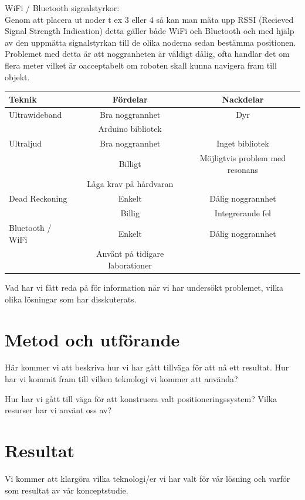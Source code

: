 \documentclass[11pt, a4paper]{report}
\begin{document}
WiFi / Bluetooth signalstyrkor: \\

Genom att placera ut noder t ex 3 eller 4 så kan man mäta upp RSSI (Recieved Signal Strength Indication) detta gäller både WiFi och Bluetooth och med hjälp av den uppmätta signalstyrkan till de olika noderna sedan bestämma positionen. Problemet med detta är att noggranheten är väldigt dålig, ofta handlar det om flera meter vilket är oacceptabelt om roboten skall kunna navigera fram till objekt.

\begin{center}
     \begin{tabular}{l | c | c}
  		Teknik & Fördelar & Nackdelar \\ \hline
        Ultrawideband & Bra noggrannhet & Dyr\\
         & Arduino bibliotek \\ \hline
        Ultraljud & Bra noggrannhet & Inget bibliotek\\
        & Billigt & Möjligtvis problem med resonans\\
        & Låga krav på hårdvaran \\ \hline
        Dead Reckoning & Enkelt & Dålig noggrannhet \\
        & Billig & Integrerande fel \\ \hline
        Bluetooth / WiFi & Enkelt & Dålig noggrannhet \\
        & Använt på tidigare laborationer
  \end{tabular}
  \end{center}


Vad har vi fått reda på för information när vi har undersökt problemet, vilka olika lösningar som har disskuterats. 

\chapter{Metod och utförande}
Här kommer vi att beskriva hur vi har gått tillväga för att nå ett resultat. Hur har vi kommit fram till vilken teknologi vi kommer att använda?

Hur har vi gått till väga för att konstruera valt positioneringssystem?
Vilka resurser har vi använt oss av?


\chapter{Resultat}
Vi kommer att klargöra vilka teknologi/er vi har valt för vår lösning och varför som resultat av vår konceptstudie.
\end{document}
